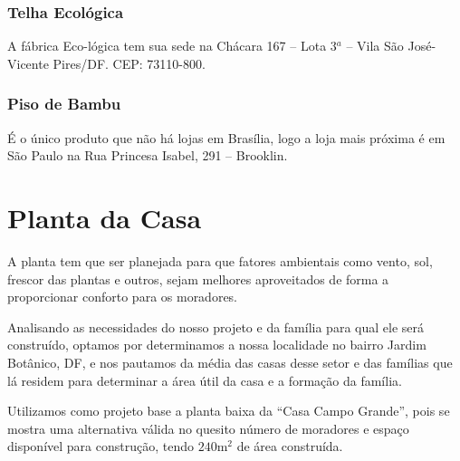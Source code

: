 \subsubsection*{\textbf{Telha Ecológica}}

	A fábrica Eco-lógica tem sua sede na Chácara 167 – Lota 3$^a$ – Vila São José- Vicente Pires/DF. CEP: 73110-800.

\subsubsection*{\textbf{Piso de Bambu}}

	É o único produto que não há lojas em Brasília, logo a loja mais próxima é em São Paulo na Rua Princesa Isabel, 291 – Brooklin.


\section{Planta da Casa}

	A planta tem que ser planejada para que fatores ambientais como vento, sol, frescor das plantas e outros, sejam melhores aproveitados de forma a proporcionar conforto para os moradores.

	Analisando as necessidades do nosso projeto e da família para qual ele será construído, optamos por determinamos a nossa localidade no bairro Jardim Botânico, DF, e nos pautamos da média das casas desse setor e das famílias que lá residem para determinar a área útil da casa e a formação da família.

	Utilizamos como projeto base a planta baixa da “Casa Campo Grande”\cite{plantaCasa}, pois se mostra uma alternativa válida no quesito número de moradores e espaço disponível para construção, tendo $240\si{\meter}^{2}$ de área construída.


